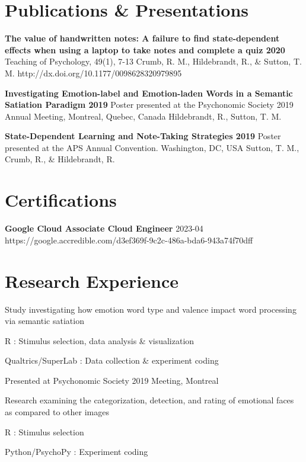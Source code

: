 \documentclass[letterpaper]{deedy-resume_sm}
\begin{document}
\section{Publications \& Presentations}
\textbf{The value of handwritten notes: A failure to find state-dependent effects when using a laptop to take notes and complete a quiz 2020}
Teaching of Psychology, 49(1), 7-13
Crumb, R. M., Hildebrandt, R., \& Sutton, T. M.
http://dx.doi.org/10.1177/0098628320979895

\textbf{Investigating Emotion-label and Emotion-laden Words in a Semantic Satiation Paradigm 2019}
Poster presented at the Psychonomic Society 2019 Annual Meeting, Montreal, Quebec, Canada
Hildebrandt, R., Sutton, T. M.

\textbf{State-Dependent Learning and Note-Taking Strategies 2019}
Poster presented at the APS Annual Convention. Washington, DC, USA
Sutton, T. M., Crumb, R., \& Hildebrandt, R.

\section{Certifications}
\textbf{Google Cloud Associate Cloud Engineer}
2023-04
https://google.accredible.com/d3ef369f-9c2c-486a-bda6-943a74f70dff

\section{Research Experience}
\begin{tightitemize}
\item Study investigating how emotion word type and valence impact word processing via semantic satiation
\item R : Stimulus selection, data analysis \& visualization
\item Qualtrics/SuperLab : Data collection \& experiment coding
\item Presented at Psychonomic Society 2019 Meeting, Montreal
\end{tightitemize}
\sectionspace

\begin{tightitemize}
\item Research examining the categorization, detection, and rating of emotional faces as compared to other images
\item R : Stimulus selection
\item Python/PsychoPy : Experiment coding
\end{tightitemize}
\sectionspace
\end{document}
